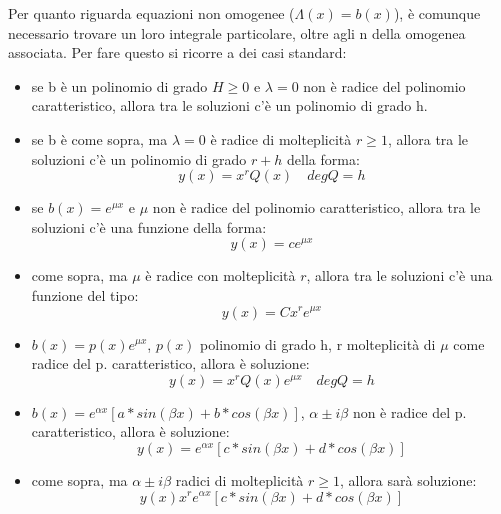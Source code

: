 \documentclass{article}
\newcommand{\Index}{
\newpage
\renewcommand*\contentsname{Indice}
\tableofcontents
}
\begin{document}
Per quanto riguarda equazioni non omogenee ($\Lambda(x)=b(x)$), è comunque necessario trovare un loro integrale particolare, oltre agli n della omogenea associata. Per fare questo si ricorre a dei casi standard:
\begin{itemize}
    \item se b è un polinomio di grado $H\geq0$ e $\lambda=0$ non è radice del polinomio caratteristico, allora tra le soluzioni c'è un polinomio di grado h.
    
    \item se b è come sopra, ma $\lambda=0$ è radice di molteplicità $r\geq1$, allora tra le soluzioni c'è un polinomio di grado $r+h$ della forma:
    $$ y(x)=x^rQ(x)\quad degQ=h $$
    
    \item se $b(x)=e^{\mu x}$ e $\mu$ non è radice del polinomio caratteristico, allora tra le soluzioni c'è una funzione della forma:
    $$ y(x)=ce^{\mu x} $$
    
    \item come sopra, ma $\mu$ è radice con molteplicità $r$, allora tra le soluzioni c'è una funzione del tipo:
    $$y(x)= Cx^re^{\mu x} $$
    
    \item $b(x)=p(x)e^{\mu x}$, $p(x)$ polinomio di grado h, r molteplicità di $\mu$ come radice del p. caratteristico, allora è soluzione:
    $$ y(x)=x^rQ(x)e^{\mu x} \quad degQ=h$$
    
    \item $b(x)=e^{\alpha x}[a*sin(\beta x)+b*cos(\beta x)]$, $\alpha\pm i\beta$ non è radice del p. caratteristico, allora è soluzione:
    $$y(x)= e^{\alpha x}[c*sin(\beta x)+d*cos(\beta x)] $$
    
    \item come sopra, ma $\alpha\pm i\beta$ radici di molteplicità $r\geq1$, allora sarà soluzione:
    $$y(x) x^re^{\alpha x}[c*sin(\beta x)+d*cos(\beta x)] $$
    
\end{itemize}
















\Index
\end{document}

